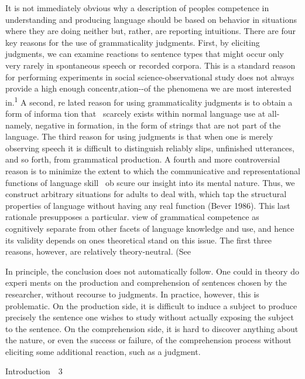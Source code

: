 \begin{styleStandard}
It is not immediately obvious why a description of people{\textquotesingle}s competence in understanding and producing language should be based on behavior in situations where they are doing neither but, rather, are reporting intuitions. There are four key reasons for the use of grammaticality judgments. First, by eliciting judgments, we can examine reactions to sentence types that might occur only very rarely in spontaneous speech or recorded corpora. This is a standard reason for performing experiments in social science-observational study does not always provide a high enough concentr,ation-{}-of the phenomena we are most interested in.\textsuperscript{1}\textsuperscript{ }A second, re\- lated reason for using grammaticality judgments is to obtain a form of informa\- tion that \ scarcely exists within normal language use at all-namely, negative in\- formation, in the form of strings that are not part of the language. The third reason for using judgments is that when one is merely observing speech it is difficult to distinguish reliably slips, unfinished utterances, and so forth, from grammatical production. A fourth and more controversial reason is to minimize the extent to which the communicative and representational functions of language skill \ ob\- scure our insight into its mental nature. Thus, we construct arbitrary situations for adults to deal with, which tap the structural properties of language without having any real function (Bever 1986). This last rationale presupposes a particular. view of grammatical competence as cognitively separate from other facets of language knowledge and use, and hence its validity depends on one{\textquotesingle}s theoretical stand on this issue. The first three reasons, however, are relatively theory-neutral. (See
\end{styleStandard}


\setcounter{listWWNumiiileveli}{0}
\begin{listWWNumiiileveli}
\item 
\begin{styleStandard}
In principle, the conclusion does not automatically follow. One could in theory do experi\- ments on the production and comprehension of sentences chosen by the researcher, without recourse to judgments. In practice, however, this is problematic. On the production side, it is difficult to induce a subject to produce precisely the sentence one wishes to study without actually exposing the subject to the sentence. On the comprehension side, it is hard to discover anything about the nature, or even the success or failure, of the comprehension process without eliciting some additional reaction, such as a judgment.
\end{styleStandard}


\end{listWWNumiiileveli}
\clearpage\setcounter{page}{1}\begin{styleStandard}
Introduction\ \ 3
\end{styleStandard}


